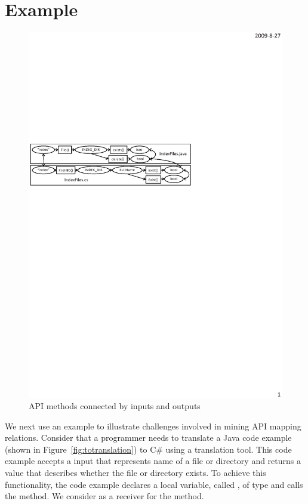 \section{Example}
\label{sec:example}

\begin{figure}[t]
\centering
\includegraphics[scale=0.65,clip]{figure/dataflow.eps}\vspace*{-3ex}
 \caption
{\label{fig:dataflow}API methods connected by inputs and
outputs}\vspace*{-3ex}
\end{figure}

We next use an example to illustrate challenges involved in
mining API mapping relations. Consider that a programmer needs to translate
a Java code example (shown in Figure~\ref{fig:totranslation}) to C\# using a translation tool.
This code example accepts a  input that represents
name of a file or directory and returns a  value that
describes whether the file or directory exists. To achieve this functionality,
the code example declares a local variable, called ,
of type  and calls the  method.
We consider  as a receiver for the  method.


